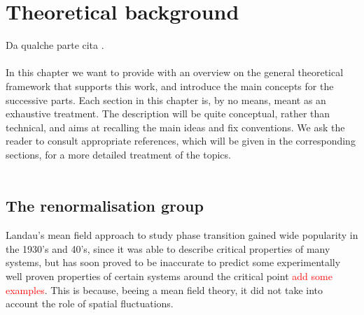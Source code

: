 \chapter{Theoretical background}
\label{chap:background}

Da qualche parte cita \cite{carosso2020novel}. \\~\\
In this chapter we want to provide with an overview on the general theoretical framework that supports this work, and introduce the main concepts for the successive parts. Each section in this chapter is, by no means, meant as an exhaustive treatment. The description will be quite conceptual, rather than technical, and aims at recalling the main ideas and fix conventions. We ask the reader to consult appropriate references,  which will be given in the corresponding sections, for a more detailed treatment of the topics. \\~\\

\section{The renormalisation group}
Landau's mean field approach to study phase transition \cite{Landau:1937obd} gained wide popularity in the 1930's and 40's, since it was able to describe critical properties of many systems, but has soon proved to be inaccurate to predict some experimentally well proven properties of certain systems around the critical point \textcolor{red}{add some examples}. This is because, beeing a mean field theory, it did not take into account the role of spatial fluctuations.
